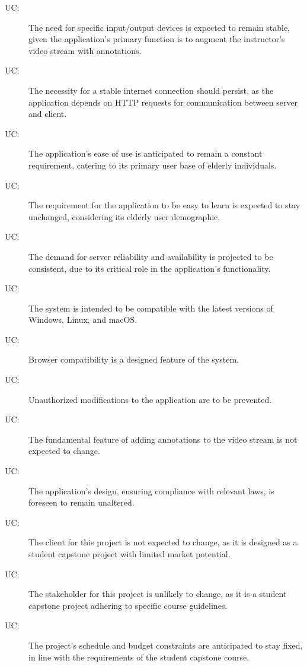 \documentclass[12pt, titlepage]{article}
\newcounter{ucnum}
\newcommand{\uctheucnum}{UC\theucnum}
\begin{document}
\begin{description}
\item[ \uctheucnum:] The need for specific input/output devices is expected to remain stable, given the application's primary function is to augment the instructor’s video stream with annotations.

\item[ \uctheucnum:]  The necessity for a stable internet connection should persist, as the application depends on HTTP requests for communication between server and client.

\item[ \uctheucnum:]  The application's ease of use is anticipated to remain a constant requirement, catering to its primary user base of elderly individuals.

\item[ \uctheucnum:] The requirement for the application to be easy to learn is expected to stay unchanged, considering its elderly user demographic.

\item[ \uctheucnum:] The demand for server reliability and availability is projected to be consistent, due to its critical role in the application's functionality.

\item[ \uctheucnum:] The system is intended to be compatible with the latest versions of Windows, Linux, and macOS.

\item[ \uctheucnum:] Browser compatibility is a designed feature of the system.

\item[ \uctheucnum:] Unauthorized modifications to the application are to be prevented.

\item[ \uctheucnum:] The fundamental feature of adding annotations to the video stream is not expected to change.

\item[ \uctheucnum:] The application's design, ensuring compliance with relevant laws, is foreseen to remain unaltered.

\item[ \uctheucnum:] The client for this project is not expected to change, as it is designed as a student capstone project with limited market potential.

\item[ \uctheucnum:] The stakeholder for this project is unlikely to change, as it is a student capstone project adhering to specific course guidelines.

\item[ \uctheucnum:] The project's schedule and budget constraints are anticipated to stay fixed, in line with the requirements of the student capstone course.
\end{description}
\end{document}
